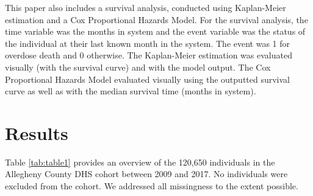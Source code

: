 \documentclass[twoside,10.5pt]{article}
\begin{document}
This paper also includes a survival analysis, conducted using Kaplan-Meier estimation and a Cox Proportional Hazards Model. For the survival analysis, the time variable was the months in system and the event variable was the status of the individual at their last known month in the system. The event was 1 for overdose death and 0 otherwise. The Kaplan-Meier estimation was evaluated visually (with the survival curve) and with the model output. The Cox Proportional Hazards Model  evaluated visually using the outputted survival curve as well as with the median survival time (months in system). 

\section{Results}

Table \ref{tab:table1} provides an overview of the 120,650 individuals in the Allegheny County DHS cohort between 2009 and 2017. No individuals were excluded from the cohort. We addressed all missingness to the extent possible.

\newpage
\end{document}
